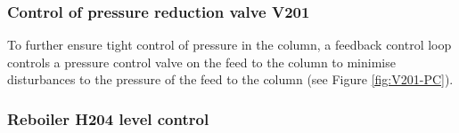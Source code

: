 \subsubsection{Control of pressure reduction valve V201} %
To further ensure tight control of pressure in the column, a feedback control loop controls a pressure control valve on the feed to the column to minimise disturbances to the pressure of the feed to the column (see Figure \ref{fig:V201-PC}). %







\subsubsection{Reboiler H204 level control} %


